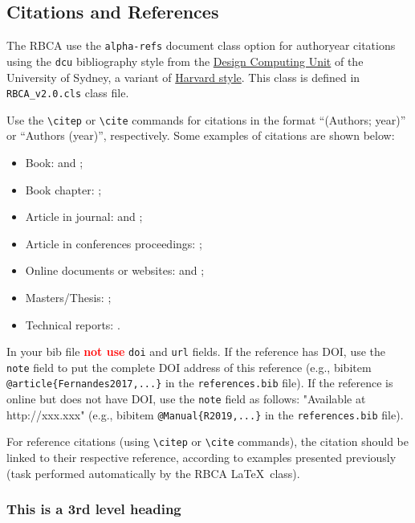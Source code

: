 \documentclass[alpha-refs,brazilian]{RBCA_v3.0}
\begin{document}
\subsection{Citations and References}
The RBCA use the \verb|alpha-refs| document class option for authoryear citations using the \verb|dcu| bibliography style from the \href{https://www.dcu.ie/library/classes_and_tutorials/citing.shtml}{Design Computing Unit} of the University of Sydney, a variant of \href{https://www.ctan.org/pkg/harvard}{Harvard style}. This class is defined in \verb|RBCA_v2.0.cls| class file.

Use the \verb|\citep| or \verb|\cite| commands for citations in the format ``(Authors; year)'' or ``Authors (year)'', respectively.
Some examples of citations are shown below:
\begin{itemize}
	\item Book: \cite{Dongarra2003} and \citep{Wickham2017};
	\item Book chapter: \cite{Holbig2004};
	\item Article in journal: \citep{Fernandes2017} and \cite{Resenes2019};
	\item Article in conferences proceedings: \cite{Holbig2014};
	\item Online documents or websites: \citep{Shiny2019} and \cite{R2019};
	\item Masters/Thesis: \cite{Nicolau2018};
	\item Technical reports: \citep{Holbig2003}.
\end{itemize}

In your bib file \textcolor{red}{\textbf{not use}} \verb|doi| and \verb|url| fields. If the reference has DOI, use the \verb|note| field to put the complete DOI address of this reference (e.g.,  bibitem \verb|@article{Fernandes2017,...}| in the \verb|references.bib| file). If the reference is online but does not have DOI, use the \verb|note| field as follows: "Available at http://xxx.xxx" (e.g., bibitem \verb|@Manual{R2019,...}| in the \verb|references.bib| file).

For reference citations (using \verb|\citep| or \verb|\cite| commands), the citation should be linked to their respective reference, according to examples presented previously (task performed automatically by the RBCA \LaTeX\ class).

\subsubsection{This is a 3rd level heading}
\end{document}
